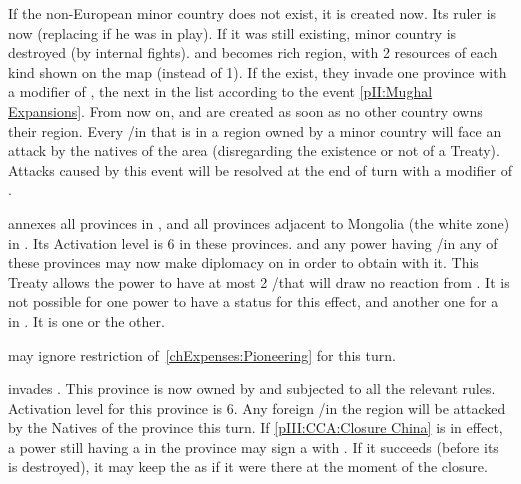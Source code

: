 

\phevnt
\aparag If the non-European minor country \paysMogol does not exist, it is
created now. Its ruler is now  (replacing \leaderAkbar if
he was in play).
\aparag If it was still existing, minor country \paysVijayanagar is destroyed
(by internal fights).
\aparag \granderegionBengale and \granderegionKarnatika becomes rich region,
with 2 resources of each kind shown on the map (instead of 1).
\aparag If the \paysMogol exist, they invade one province with a modifier of
, the next in the list according to the event \ref{pII:Mughal
  Expansions}.
\aparag From now on, \paysMysore and \paysHyderabad are created as soon as no
other country owns their region.
\aparag Every \TP/\COL in \continentIndia that is in a region owned by a minor
country will face an attack by the natives of the area (disregarding the
existence or not of a Treaty). Attacks caused by this event will be resolved
at the end of turn with a modifier of .





\phevnt
\aparag \paysChina annexes all provinces in \granderegionAmour, and all
provinces adjacent to Mongolia (the white zone) in \granderegionBaikal. Its
Activation level is 6 in these provinces.
\aparag \RUS and any power having \COL/\TP in any of these provinces may now
make diplomacy on \paysChina in order to obtain \dipAT with it. This Treaty
allows the power to have at most 2 \COL/\TP that will draw no reaction from
\paysChina.
\aparag It is not possible for one power to have a \dipAT status for this
effect, and another one for a \TP in \paysChina. It is one or the other.

\phadm
\aparag \RUS may ignore restriction of~\ref{chExpenses:Pioneering} for this
turn.





\phevnt
\aparag \paysChina invades \granderegionFormose.  This province is now owned
by \paysChina and subjected to all the relevant rules. Activation level for
this province is 6.
\aparag Any foreign \TP/\COL in the region will be attacked by the Natives of
the province this turn.
\aparag If \ref{pIII:CCA:Closure China} is in effect, a power still having a
\TP in the province may sign a \dipAT with \paysChina. If it succeeds (before
its \TP is destroyed), it may keep the \TP as if it were there at the moment
of the closure.



